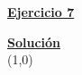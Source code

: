 \indent\underline{\textbf{Ejercicio 7}}\\
\lipsum[4]

\indent\underline{\textbf{Solución}}\\

\line(1,0){\textwidth}
